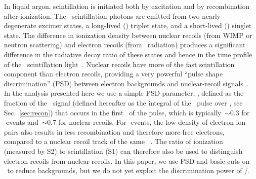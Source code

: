 In liquid argon, scintillation is initiated both by excitation and by recombination after ionization.  The \arwave\ scintillation photons are emitted from two nearly degenerate excimer states, a long-lived (\longlivedtriplestatedimerargon) triplet state, and a short-lived (\shortlivedtriplestatedimerargon) singlet state.  The difference in ionization density between nuclear recoils (from WIMP or neutron scattering) and electron recoils (from \bg\ radiation) produces a significant difference in the radiative decay ratio of these states and hence in the time profile of the \sone\ scintillation light~\cite{kubota,hitachi}.  Nuclear recoils have more of the fast scintillation component than electron recoils, providing a very powerful ``pulse shape discrimination'' (PSD) between electron backgrounds and nuclear-recoil signals~\cite{boulay}.  In the analysis presented here we use a simple PSD parameter, \fno, defined as the fraction of the \sone\ signal (defined hereafter as the integral of the \sone\ pulse over \fixedintone, see Sec.~\ref{sec:recon}) that occurs in the first \timefno\ of the pulse, which is typically~$\sim$\num{0.3} for \bg-events and~$\sim$\num{0.7} for nuclear recoils.  For \bg-events, the low density of electron-ion pairs also results in less recombination and therefore more free electrons, compared to a nuclear recoil track of the same \sone~\cite{kubota,doke,xenon93}.  The ratio of ionization (measured by S2) to scintillation (S1) can therefore also be used to distinguish electron recoils from nuclear recoils. In this paper, we use PSD and basic cuts on \stwo\ to reduce backgrounds, but we do not yet exploit the discrimination power of \stwo/\sone.
